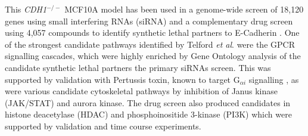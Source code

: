 This \textit{CDH1}$^{-/-}$  MCF10A model has been used in a genome-wide screen of 18,120 genes using small interfering RNAs (siRNA) and a complementary drug screen using 4,057 compounds to identify synthetic lethal partners to E-Cadherin \cite{Telford2015}. One of the strongest candidate pathways identified by Telford \textit{et al}. \cite{Telford2015} were the GPCR signalling cascades, which were highly enriched by Gene Ontology analysis of the candidate synthetic lethal partners the primary siRNAs screen. This was supported by validation with Pertussis toxin, known to target  G$_{\alpha i}$ signalling \cite{Clark2004}, as were various candidate cytoskeletal pathways by inhibition of Janus kinase (JAK/STAT) and aurora kinase. The drug screen also produced candidates in histone deacetylase (HDAC) and phosphoinositide 3-kinase (PI3K) which were supported by validation and time course experiments.



